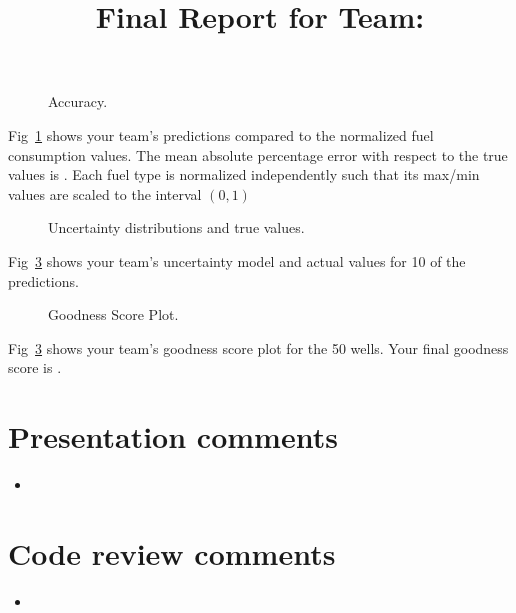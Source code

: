 \documentclass[11pt, oneside]{article}   	%
\title{Final Report for Team: \VAR{teamname}}
\date{}
\begin{document}
\maketitle

\begin{figure}[htbp] %
   \centering
   \scalebox{0.75}{}
   \caption{Accuracy.}
   \label{fig:accuracy}
\end{figure}
%
Fig~\ref{fig:accuracy} shows your team's predictions compared to the normalized fuel consumption values.  The mean absolute percentage error with respect to the true values is .  Each fuel type is normalized independently such that its max/min values are scaled to the interval $(0, 1)$

\newpage

\begin{figure}[tbph] %
   \centering
   \scalebox{0.55}{}
   \caption{Uncertainty distributions and true values.}
   \label{fig:realizations}
\end{figure}
%
Fig~\ref{fig:realizations} shows your team's uncertainty model and actual values for 10 of the predictions.

\newpage

\begin{figure}[tbph] %
   \centering
   \scalebox{0.7}{}
   \caption{Goodness Score Plot.}
   \label{fig:realizations}
\end{figure}
%
Fig~\ref{fig:realizations} shows your team's goodness score plot for the 50 wells.  Your final goodness score is .

\newpage

\section*{Presentation comments}
\begin{itemize}
  \item {}
\end{itemize}

\section*{Code review comments}
\begin{itemize}
  \item {}
\end{itemize}
\end{document}
